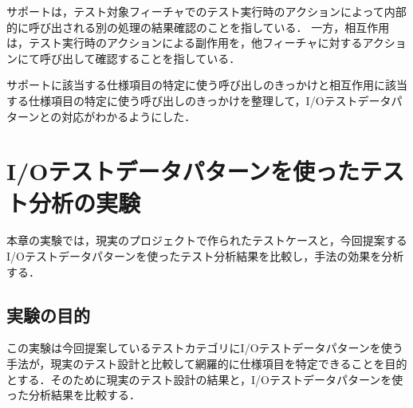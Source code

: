 \documentclass[a4paper,12pt]{jreport}
\begin{document}
サポートは，テスト対象フィーチャでのテスト実行時のアクションによって内部的に呼び出される別の処理の結果確認のことを指している．
一方，相互作用は，テスト実行時のアクションによる副作用を，他フィーチャに対するアクションにて呼び出して確認することを指している．

サポートに該当する仕様項目の特定に使う呼び出しのきっかけと相互作用に該当する仕様項目の特定に使う呼び出しのきっかけを整理して，I/Oテストデータパターンとの対応がわかるようにした．

\section{I/Oテストデータパターンを使ったテスト分析の実験}
本章の実験では，現実のプロジェクトで作られたテストケースと，今回提案するI/Oテストデータパターンを使ったテスト分析結果を比較し，手法の効果を分析する．

\subsection{実験の目的}
この実験は今回提案しているテストカテゴリにI/Oテストデータパターンを使う手法が，現実のテスト設計と比較して網羅的に仕様項目を特定できることを目的とする．そのために現実のテスト設計の結果と，I/Oテストデータパターンを使った分析結果を比較する．

\end{document}
